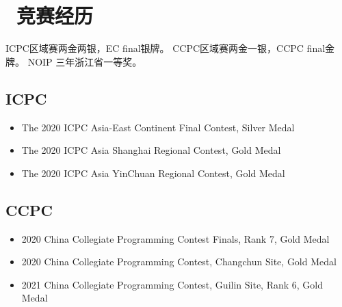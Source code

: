 \section{\faStar\ 竞赛经历}
ICPC区域赛两金两银，EC final银牌。
CCPC区域赛两金一银，CCPC final金牌。
NOIP 三年浙江省一等奖。

\subsection{ICPC}
    \begin{itemize}
        \item The 2020 ICPC Asia-East Continent Final Contest, Silver Medal
        \item The 2020 ICPC Asia Shanghai Regional Contest, Gold Medal
        \item The 2020 ICPC Asia YinChuan Regional Contest, Gold Medal
    \end{itemize}
\subsection{CCPC}
    \begin{itemize}
        \item 2020 China Collegiate Programming Contest Finals, Rank 7, Gold Medal
        \item 2020 China Collegiate Programming Contest, Changchun Site, Gold Medal
        \item 2021 China Collegiate Programming Contest, Guilin Site, Rank 6, Gold Medal
    \end{itemize}

